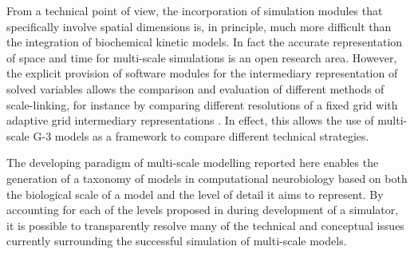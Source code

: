 \documentclass{article}
\begin{document}
From a technical point of view, the incorporation of simulation
modules that specifically involve spatial dimensions is, in principle,
much more difficult than the integration of biochemical kinetic
models. In fact the accurate representation of space and time for
multi-scale simulations is an open research area.  However, the
explicit provision of software modules for the intermediary
representation of solved variables allows the comparison and evaluation of
different methods of scale-linking, for instance by comparing
different resolutions of a fixed grid with adaptive grid intermediary
representations \cite{MO:2009bh}. In effect, this allows
the use of multi-scale G-3 models as a framework to compare different
technical strategies.

The developing paradigm of multi-scale modelling reported here
enables the generation of a taxonomy of models in computational neurobiology
based on both the biological scale of a model and the level of detail
it aims to represent. By accounting for each of the levels proposed in \cite{Marr:19821kx} during development of a simulator, it is possible to transparently resolve many of the technical and conceptual issues currently surrounding the successful simulation of multi-scale models.

%
 
\end{document}
